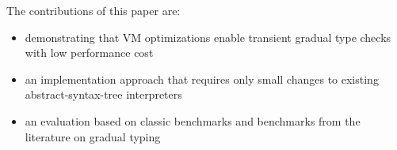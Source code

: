 
The contributions of this paper are:

\begin{itemize}
\item demonstrating that VM optimizations enable
        transient gradual type checks with low performance cost
\item an implementation approach that requires
      only small changes to existing abstract-syntax-tree interpreters
\item an evaluation based on classic benchmarks
      and benchmarks from the literature on gradual typing
\end{itemize}
